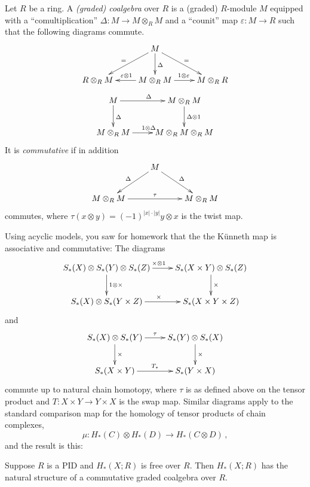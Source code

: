 \begin{definition}
Let $R$ be a ring. A {\em (graded) coalgebra} over $R$ is a (graded) $R$-module $M$ equipped with a ``comultiplication'' $\Delta:M\to M\otimes_R M$ and a ``counit'' map $\varepsilon:M\to R$ such that the following diagrams commute.
\begin{equation*}
\xymatrix{ & M\ar[d]^\Delta\ar[dr]^=\ar[dl]_= & \\
R\otimes_R M & M\otimes_R M\ar[l]_{\varepsilon\otimes 1}\ar[r]^{1\otimes\varepsilon} & M\otimes_R R}
\end{equation*}
\begin{equation*}
\xymatrix{
	M\ar[r]^{\Delta}\ar[d]^{\Delta} & M\otimes_R M\ar[d]^{\Delta\otimes 1}\\
	M\otimes_R M\ar[r]^{1\otimes\Delta} & M\otimes_R M\otimes_R M
}\end{equation*}
It is {\em commutative} if in addition
\begin{equation*}
\xymatrix{
	 & M\ar[dl]_\Delta\ar[dr]^\Delta &\\
	M\otimes_R M\ar[rr]^{\tau} & & M\otimes_R M
}\end{equation*}
commutes, where $\tau(x\otimes y)=(-1)^{|x|\cdot|y|}y\otimes x$ is the twist map.
\end{definition}

Using acyclic models, you saw for homework that the 
the K\"{u}nneth map is associative and commutative: The diagrams
\[
\xymatrix{S_\ast(X)\otimes S_\ast(Y)\otimes S_\ast(Z) \ar[r]^{\times\otimes1}
\ar[d]^{1\otimes\times} & S_\ast(X\times Y)\otimes S_\ast(Z) \ar[d]^{\times} \\
S_\ast(X)\otimes S_\ast(Y\times Z) \ar[r]^\times & S_\ast(X\times Y\times Z)
}\]
and
\begin{equation*}
\xymatrix{S_\ast(X)\otimes S_\ast(Y)\ar[r]^{\tau}\ar[d]^{\times} & S_\ast(Y)\otimes S_\ast(X)\ar[d]^{\times}\\
S_\ast(X\times Y)\ar[r]^{T_\ast} & S_\ast(Y\times X)
}\end{equation*}
commute up to natural chain homotopy, where $\tau$ is as defined above on the tensor product and $T:X\times Y\to Y\times X$ is the swap map. Similar diagrams
apply to the standard comparison map for the homology of tensor products
of chain complexes,
\[
\mu:H_\ast(C)\otimes H_\ast(D)\to H_\ast(C\otimes D)\,,
\]
and the result is this:
\begin{corollary}
Suppose $R$ is a PID and $H_*(X;R)$ is free over $R$. 
Then $ H_\ast(X;R)$ has the natural structure of a commutative graded coalgebra over $R$.
\end{corollary}

